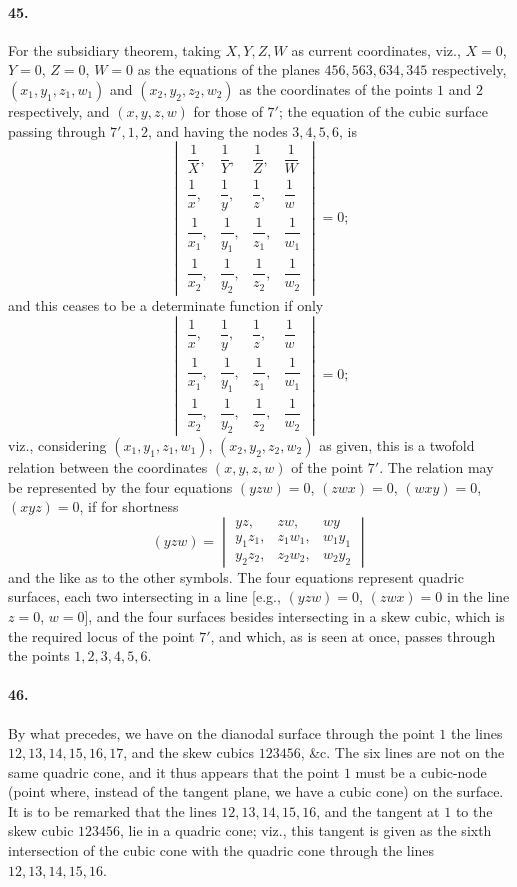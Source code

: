 \documentclass[11pt,a4paper]{article}
\begin{document}
\paragraph{45.}
For the subsidiary theorem, taking $X, Y, Z, W$ as current coordinates, viz., $X = 0$,
$Y = 0$, $Z = 0$, $W = 0$ as the equations of the planes $456, 563, 634, 345$ respectively,
$(x_1, y_1, z_1, w_1)$ and $(x_2, y_2, z_2, w_2)$ as the coordinates of the points $1$ and
$2$ respectively, and $(x, y, z, w)$ for those of $7'$; the equation of the cubic surface
passing through $7', 1, 2$, and having the nodes $3, 4, 5, 6$, is
\[
\begin{vmatrix}
\dfrac{1}{X}, & \dfrac{1}{Y}, & \dfrac{1}{Z}, & \dfrac{1}{W} \\[4pt]
\dfrac{1}{x}, & \dfrac{1}{y}, & \dfrac{1}{z}, & \dfrac{1}{w} \\[4pt]
\dfrac{1}{x_1}, & \dfrac{1}{y_1}, & \dfrac{1}{z_1}, & \dfrac{1}{w_1} \\[4pt]
\dfrac{1}{x_2}, & \dfrac{1}{y_2}, & \dfrac{1}{z_2}, & \dfrac{1}{w_2}
\end{vmatrix} = 0;
\]
and this ceases to be a determinate function if only
\[
\begin{vmatrix}
\dfrac{1}{x}, & \dfrac{1}{y}, & \dfrac{1}{z}, & \dfrac{1}{w} \\[4pt]
\dfrac{1}{x_1}, & \dfrac{1}{y_1}, & \dfrac{1}{z_1}, & \dfrac{1}{w_1} \\[4pt]
\dfrac{1}{x_2}, & \dfrac{1}{y_2}, & \dfrac{1}{z_2}, & \dfrac{1}{w_2}
\end{vmatrix} = 0;
\]
viz., considering $(x_1, y_1, z_1, w_1)$, $(x_2, y_2, z_2, w_2)$ as given, this is a
twofold relation between the coordinates $(x, y, z, w)$ of the point $7'$. The relation may
be represented by the four equations $(yzw) = 0$, $(zwx) = 0$, $(wxy) = 0$, $(xyz) = 0$, if
for shortness
\[
(yzw) =
\begin{vmatrix}
yz, & zw, & wy \\
y_1 z_1, & z_1 w_1, & w_1 y_1 \\
y_2 z_2, & z_2 w_2, & w_2 y_2
\end{vmatrix}
\]
and the like as to the other symbols. The four equations represent quadric surfaces, each
two intersecting in a line [e.g., $(yzw) = 0$, $(zwx) = 0$ in the line $z = 0$, $w = 0$],
and the four surfaces besides intersecting in a skew cubic, which is the required locus of
the point $7'$, and which, as is seen at once, passes through the points $1, 2, 3, 4, 5, 6$.

\paragraph{46.}
By what precedes, we have on the dianodal surface through the point $1$ the lines
$12, 13, 14, 15, 16, 17$, and the skew cubics $123456$, \&c. The six lines are not on the
same quadric cone, and it thus appears that the point $1$ must be a cubic-node (point where,
instead of the tangent plane, we have a cubic cone) on the surface. It is to be remarked
that the lines $12, 13, 14, 15, 16$, and the tangent at $1$ to the skew cubic $123456$, lie
in a quadric cone; viz., this tangent is given as the sixth intersection of the cubic cone
with the quadric cone through the lines $12, 13, 14, 15, 16$.
\end{document}
